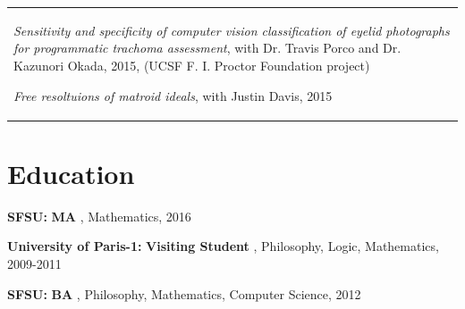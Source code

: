 \documentclass[margin,line,pifont,palatino,courier]{res}
\newenvironment{list1}{
  \begin{list}{\label{ } }{
      \setlength{\itemsep}{0in}
      \setlength{\parsep}{0in} \setlength{\parskip}{0in}
      \setlength{\topsep}{0in} \setlength{\partopsep}{0in}
      \setlength{\leftmargin}{0.0in} } }{\end{list} }
\begin{document}
\begin{resume}
\begin{tabular}{@{}p{5in}}
\begin{list1}
        
      \vspace{.2em}
      
        
            \item {\em Sensitivity and specificity of computer vision classification of eyelid photographs for programmatic trachoma assessment},  with Dr. Travis Porco and Dr. Kazunori Okada,  2015, (UCSF F. I. Proctor Foundation project)  
        
      \vspace{.2em}
      
        
            \item {\em Free resoltuions of matroid ideals},  with Justin Davis,  2015 
        
      \vspace{.2em}
      
    \end{list1}
  \end{tabular}


\section{\sc Education} 
  \begin{list1}
    
    
        \item  {\bf SFSU:}\textbf{ MA }, Mathematics, 2016

          
    
        \item  {\bf University of Paris-1:}\textbf{ Visiting Student }, Philosophy, Logic, Mathematics, 2009-2011

          
    
        \item  {\bf SFSU:}\textbf{ BA }, Philosophy, Mathematics, Computer Science, 2012

          
    

  \end{list1}



\end{resume}
\end{document}
